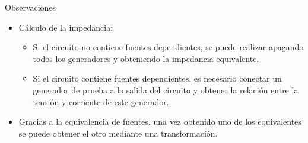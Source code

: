 \documentclass[aspectratio=169, usenames,svgnames,dvipsnames]{beamer}
\begin{document}
\begin{frame}[label={sec:org0b88b88}]{Observaciones}
\begin{itemize}
\item Cálculo de la impedancia:
\begin{itemize}
\item Si el circuito \alert{no} contiene fuentes dependientes, se puede realizar \alert{apagando} todos los \alert{generadores} y obteniendo la impedancia equivalente.
\item Si el circuito contiene fuentes dependientes, es necesario conectar un \alert{generador de prueba} a la salida del circuito y obtener la relación entre la tensión y corriente de este generador.
\end{itemize}

\item Gracias a la equivalencia de fuentes, una vez obtenido uno de los equivalentes se puede obtener el otro mediante una transformación.
\end{itemize}
\end{frame}
\end{document}
